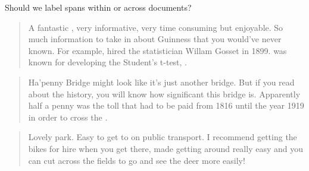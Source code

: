 

\begin{frame}{Should we label spans within or across documents?}
\scriptsize
   \begin{quote}
       A fantastic , very informative, very
       time consuming but enjoyable. So much information to take in about
       Guinness that you would’ve never known. For example,
        hired the statistician Willam
       Gosset in 1899.  was known for developing the Student’s t-test,
       .
   \end{quote}
   \begin{quote}
       Ha’penny Bridge might look like it’s just another bridge. But if you
       read about the history, you will know how significant this bridge
       is. Apparently half a penny was the toll that had to be paid from
       1816 until the year 1919 in order to cross the
       .
   \end{quote}
   \begin{quote}
       Lovely park. Easy to get to on public transport. I recommend getting
       the bikes for hire when you get there,  made getting around really easy and you can cut across the fields to go and see the deer more easily!
   \end{quote}
   \centering
   \normalsize

\end{frame}

